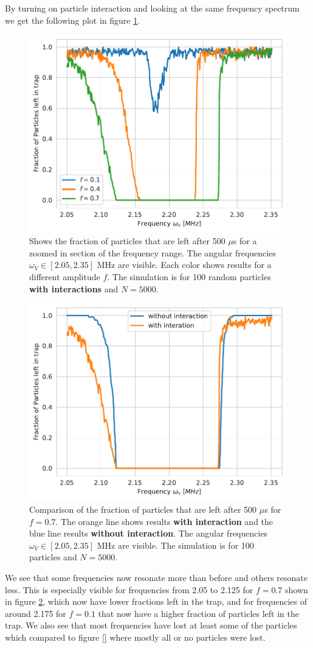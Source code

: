 \documentclass[english,notitlepage,reprint,nofootinbib]{revtex4-1}  %
\begin{document}
By turning on particle interaction and looking at the same frequency spectrum we get the following plot in figure \ref{fig:narrow_freq_p_left_N_5000_interaction_zoom}.
\begin{figure}[H]
    \centering
    \includegraphics[width=.5\textwidth]{../figures/narrow_freq_p_left_N_5000_interaction_zoom.pdf}
    \caption{Shows the fraction of particles that are left after 500 $\mu$s for a zoomed in section of the frequency range. The angular frequencies $\omega_V \in [2.05,2.35]$ MHz are visible. Each color shows results for a
        different amplitude $f$. The simulation is for 100 random particles \textbf{with interactions} and $N = 5000$.}
    \label{fig:narrow_freq_p_left_N_5000_interaction_zoom}
\end{figure}
\begin{figure}[H]
    \centering
    \includegraphics[width=.5\textwidth]{../figures/narrow_freq_p_left_N_5000_zoom_compare.pdf}
    \caption{Comparison of the fraction of particles that are left after 500 $\mu$s for $f = 0.7$. The orange line shows results \textbf{with interaction} and the blue line results \textbf{without interaction}. The angular frequencies $\omega_V \in [2.05,2.35]$ MHz are visible. The simulation is for 100 particles and $N = 5000$.}
    \label{fig:narrow_freq_p_left_N_5000_zoom_compare}
\end{figure}
We see that some frequencies now resonate more than before and others resonate less. This is especially visible for frequencies from 2.05 to 2.125 for $f=0.7$ shown in figure \ref{fig:narrow_freq_p_left_N_5000_zoom_compare}, which now have lower fractions left in the trap, and for frequencies of around 2.175 for $f=0.1$ that now have a higher fraction of particles left in the trap. We also see that most frequencies have lost at least some of the particles which compared to figure \ref{} where mostly all or no particles were lost.
\end{document}
